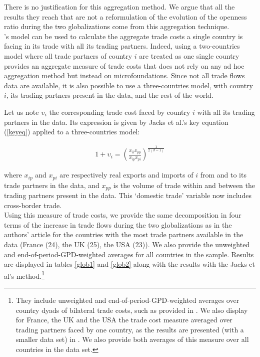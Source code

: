 \documentclass{article}
\begin{document}
There is no justification for this aggregation method. We argue that
all the results they reach that are not a reformulation of the
evolution of the openness ratio during the two
globalizations come from this aggregation technique.\\

\cite{AW2003}'s model can be used to calculate the aggregate
trade costs a single country is facing in its trade with all
its trading partners. Indeed, using a two-countries model where
all trade partners of country $i$ are treated as one single
country provides an aggregate measure of trade costs that does
not rely on any ad hoc aggregation method but instead on
microfoundations. Since not all trade flows data are available,
it is also possible to use a three-countries model, with
country $i$, its trading partners present in the data, and the
rest of the world.

Let us note $\upsilon_{i}$ the corresponding trade cost faced
by country $i$ with all its trading partners in the data. Its
expression is given by Jacks et al.'s key equation
(\ref{keyeq}) applied to a three-countries model:

\begin{eqnarray}
1+\upsilon_{i}=\left(\frac{x_{ii} x_{pp}}{x_{ip}
x_{pi}}\right)^{\frac{1}{2(\sigma-1)}} \label{keyeq3model}
\end{eqnarray}

where $x_{ip}$ and $x_{pi}$ are respectively real exports and
imports of $i$ from and to its trade partners in the data, and
$x_{pp}$ is the volume of trade within and between the trading
partners present in the data. This `domestic trade' variable
now
includes cross-border trade.\\

Using this measure of trade costs, we provide the same
decomposition in four terms of the increase in trade flows
during the two globalizations as in the authors' article for
the countries with the most trade partners available in the
data (France (24), the UK (25), the USA (23)). We also provide
the unweighted and end-of-period-GPD-weighted averages for all
countries in the sample. Results are displayed in tables
\ref{glob1} and \ref{glob2} along with the results with the
Jacks et al's method.\footnote{They include unweighted and
end-of-period-GPD-weighted averages over country dyads of
bilateral trade costs, such as provided in \cite{JMN2011}. We
also display for France, the UK and the USA the trade cost
measure averaged over trading partners faced by one country, as
the results are presented (with a smaller data set) in
\cite{JMN2008, JMN2010}. We also provide both averages of this
measure over all countries in the data set.}\\
\end{document}

